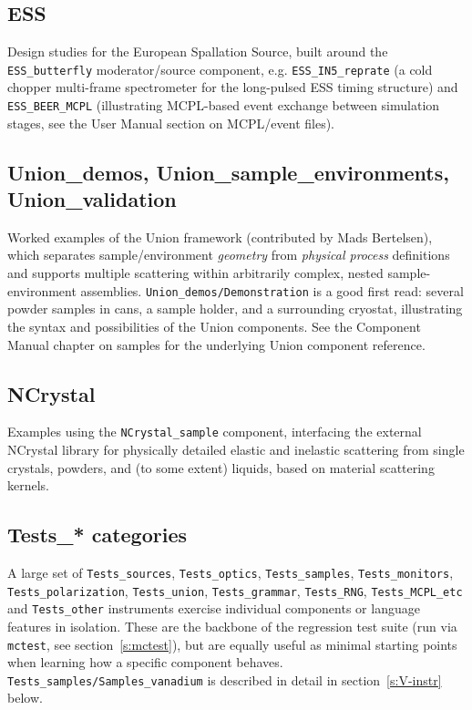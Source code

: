 \subsection{ESS}

Design studies for the European Spallation Source, built around the
\texttt{ESS\_butterfly} moderator/source component, e.g.
\texttt{ESS\_IN5\_reprate} (a cold chopper multi-frame spectrometer for the
long-pulsed ESS timing structure) and \texttt{ESS\_BEER\_MCPL} (illustrating
MCPL-based event exchange between simulation stages, see the User Manual
section on MCPL/event files).

\subsection{Union\_demos, Union\_sample\_environments, Union\_validation}

Worked examples of the Union framework (contributed by Mads Bertelsen),
which separates sample/environment \emph{geometry} from \emph{physical
process} definitions and supports multiple scattering within arbitrarily
complex, nested sample-environment assemblies. \texttt{Union\_demos/Demonstration}
is a good first read: several powder samples in cans, a sample holder, and
a surrounding cryostat, illustrating the syntax and possibilities of the
Union components. See the Component Manual chapter on samples for the
underlying Union component reference.

\subsection{NCrystal}

Examples using the \texttt{NCrystal\_sample} component, interfacing the
external NCrystal library for physically detailed elastic and inelastic
scattering from single crystals, powders, and (to some extent) liquids,
based on material scattering kernels.

\subsection{Tests\_* categories}

A large set of \texttt{Tests\_sources}, \texttt{Tests\_optics},
\texttt{Tests\_samples}, \texttt{Tests\_monitors}, \texttt{Tests\_polarization},
\texttt{Tests\_union}, \texttt{Tests\_grammar}, \texttt{Tests\_RNG},
\texttt{Tests\_MCPL\_etc} and \texttt{Tests\_other} instruments exercise
individual components or language features in isolation. These are the
backbone of the \MCS regression test suite (run via \texttt{mctest}, see
section~\ref{s:mctest}), but are equally useful as minimal starting points
when learning how a specific component behaves. \texttt{Tests\_samples/Samples\_vanadium}
is described in detail in section~\ref{s:V-instr} below.

